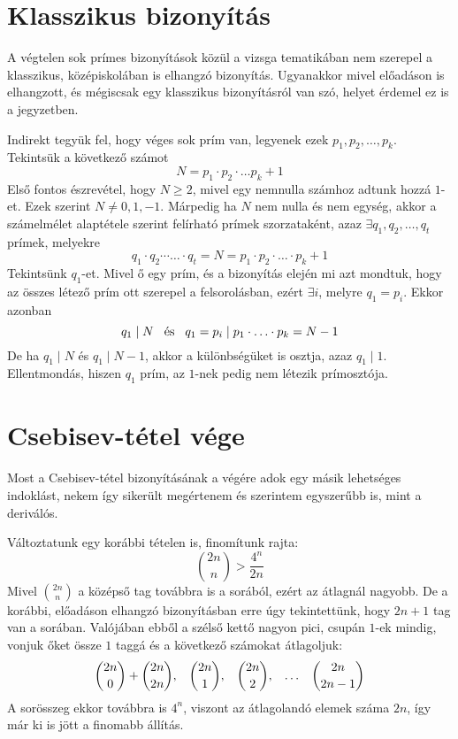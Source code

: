 \documentclass[12pt]{book}
\theoremstyle{plain} %
\theoremstyle{definition} %
\theoremstyle{remark}
\numberwithin{equation}{section}  %
\begin{document}
	\section{Klasszikus bizonyítás}
	A végtelen sok prímes bizonyítások közül a vizsga tematikában nem szerepel a klasszikus, középiskolában is elhangzó bizonyítás. Ugyanakkor mivel előadáson is elhangzott, és mégiscsak egy klasszikus bizonyításról van szó, helyet érdemel ez is a jegyzetben.
	
	Indirekt tegyük fel, hogy véges sok prím van, legyenek ezek $ p_1, p_2, \ldots, p_k $. Tekintsük a következő számot
	\[ N = p_1\cdot p_2 \cdot \ldots p_k +1  \]
	Első fontos észrevétel, hogy $ N\geq 2 $, mivel egy nemnulla számhoz adtunk hozzá $1$-et. Ezek szerint $N\neq 0,1,-1$. Márpedig ha $N$ nem nulla és nem egység, akkor a számelmélet alaptétele szerint felírható prímek szorzataként, azaz $\exists q_1, q_2, \ldots, q_t$ prímek, melyekre
	\[ q_1\cdot q_2 \cdots \ldots \cdot q_t = N = p_1\cdot p_2\cdot \ldots \cdot p_k + 1  \]
	Tekintsünk $q_1$-et. Mivel ő egy prím, és a bizonyítás elején mi azt mondtuk, hogy az összes létező prím ott szerepel a felsorolásban, ezért $\exists i$, melyre $q_1 = p_i$. Ekkor azonban
	\[ q_1 \mid N \hspace{3mm} \text{és} \hspace{3mm} q_1=p_i \mid p_1\cdot \ldots \cdot p_k = N - 1  \]
	De ha $ q_1 \mid N $ és $ q_1\mid N-1 $, akkor a különbségüket is osztja, azaz $ q_1 \mid 1 $. Ellentmondás, hiszen $q_1$ prím, az $1$-nek pedig nem létezik prímosztója.
	
	\section{Csebisev-tétel vége}
	
	Most a Csebisev-tétel bizonyításának a végére adok egy másik lehetséges indoklást, nekem így sikerült megértenem és szerintem egyszerűbb is, mint a deriválós. 
	
	Változtatunk egy korábbi tételen is, finomítunk rajta: 
	\[ {2n\choose n } > \dfrac{4^n}{2n}  \]
	Mivel ${2n\choose n}$ a középső tag továbbra is a sorából, ezért az átlagnál nagyobb. De a korábbi, előadáson elhangzó bizonyításban erre úgy tekintettünk, hogy $2n+1$ tag van a sorában.	 Valójában ebből a szélső kettő nagyon pici, csupán $1$-ek mindig, vonjuk őket össze $1$ taggá és a következő számokat átlagoljuk:
	\[ {2n\choose 0} + {2n\choose 2n},\hspace{3mm} {2n\choose 1},\hspace{3mm} {2n\choose 2}, \hspace{3mm} \ldots \hspace{3mm} {2n\choose 2n-1}  \]
	A sorösszeg ekkor továbbra is $4^n$, viszont az átlagolandó elemek száma $2n$, így már ki is jött a finomabb állítás. %
	
\end{document}
